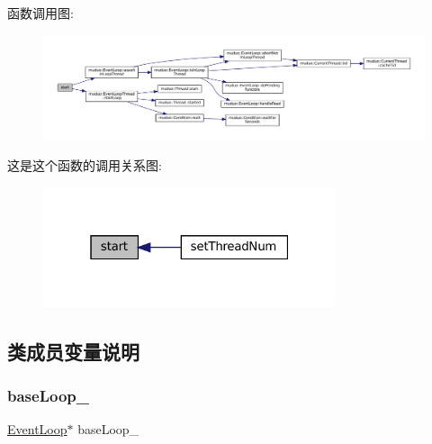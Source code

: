 函数调用图\+:
\nopagebreak
\begin{figure}[H]
\begin{center}
\leavevmode
\includegraphics[width=350pt]{classmuduo_1_1EventLoopThreadPool_a60de64d75454385b23995437f1d72669_cgraph}
\end{center}
\end{figure}
这是这个函数的调用关系图\+:
\nopagebreak
\begin{figure}[H]
\begin{center}
\leavevmode
\includegraphics[width=244pt]{classmuduo_1_1EventLoopThreadPool_a60de64d75454385b23995437f1d72669_icgraph}
\end{center}
\end{figure}


\subsection{类成员变量说明}
\mbox{\label{classmuduo_1_1EventLoopThreadPool_abd40a665f0987cb18463ec326b966b06}} 
\subsubsection{\texorpdfstring{base\+Loop\+\_\+}{baseLoop\_}}
{\footnotesize\ttfamily \hyperlink{classmuduo_1_1EventLoop}{Event\+Loop}$\ast$ base\+Loop\+\_\+\hspace{0.3cm}{\ttfamily [private]}}




